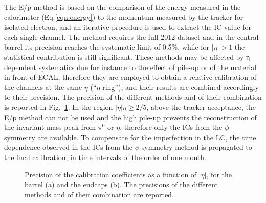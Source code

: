\documentclass[journal]{IEEEtran}
\begin{document}
The E/p method is based on the comparison of the energy measured in the calorimeter (Eq.\ref{eqn:energy}) to the momentum measured by the tracker for isolated electron, and an iterative procedure is used to extract the IC value for each single channel. The method requires the full 2012 dataset and in the central barrel its precision reaches the systematic limit of 0.5\%, while for $\vert\eta\vert>1$ the statistical contribution is still significant.
These methods may be affected by η dependent systematics due for instance to the effect of pile-up or of the material in front of ECAL, therefore they are employed to obtain a relative calibration of the channels at the same $\eta$ (``$\eta$ ring''), and their results are combined accordingly to their precision. The precision of the different methods and of their combination is reported in Fig.~\ref{fig:intercalib}. In the region $\vert\eta\vert\eta\ge2/5$, above the tracker acceptance, the E/p method can not be used and the high pile-up prevents the reconstruction of the invariant mass peak from $\pi^0$ or $\eta$, therefore only the ICs from the $\phi$-symmetry are available.
To compensate for the imperfection in the LC, the time dependence observed in the ICs from the $\phi$-symmetry method is propagated to the final calibration, in time intervals of the order of one month.
%
\begin{figure}[!t]
  \begin{center}
    \caption{Precision of the calibration coefficients as a function of $\vert\eta\vert$, for the barrel (a) and the endcaps (b). The precisions of the different methods and of their combination are reported. \label{fig:intercalib}}
  \end{center}
\end{figure}
\end{document}
